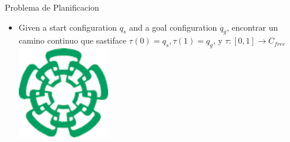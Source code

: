 \documentclass[
	11pt, %
]{beamer}
\begin{document}
\begin{frame}{Problema de Planificacion}
  \begin{itemize}
  \item Given a start configuration $q_{s}$ and a goal configuration $q_{g}$, encontrar un camino continuo que sastiface $\tau (0) = q_{s}, \tau (1)=q_{g}$, y $\tau :[0,1] \rightarrow C_{free}$ \\
    \centering
    \includegraphics[angle=45,width=4cm]{cinvestavlogo}
  \end{itemize}
\end{frame}

\end{document}
